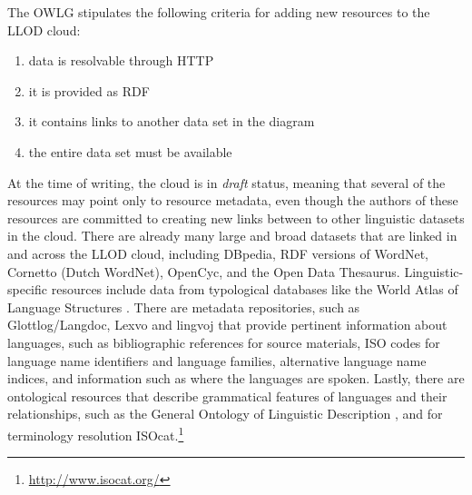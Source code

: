 The OWLG stipulates the following criteria for adding new resources to the LLOD cloud:

\begin{enumerate}
	\item data is resolvable through HTTP
	\item it is provided as RDF
	\item it contains links to another data set in the diagram 
	\item the entire data set must be available
\end{enumerate} 

At the time of writing, the cloud is in {\it draft} status, meaning that several of the resources may point only to resource metadata, even though the authors of these resources are committed to creating new links between to other linguistic datasets in the cloud. There are already many large and broad datasets that are linked in and across the LLOD cloud, including DBpedia, RDF versions of WordNet, Cornetto (Dutch WordNet), OpenCyc, and the Open Data Thesaurus. Linguistic-specific resources include data from typological databases like the World Atlas of Language Structures \citep{Haspelmath_etal2008}. There are metadata repositories, such as Glottlog/Langdoc, Lexvo and lingvoj that provide pertinent information about languages, such as bibliographic references for source materials, ISO codes for language name identifiers and language families, alternative language name indices, and information such as where the languages are spoken. Lastly, there are ontological resources that describe grammatical features of languages and their relationships, such as the General Ontology of Linguistic Description \citep{farrar2003linguistic}, and for terminology resolution ISOcat.\footnote{\url{http://www.isocat.org/}}
